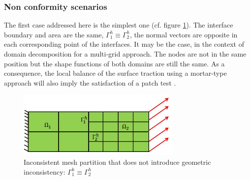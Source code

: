 \subsubsection{Non conformity scenarios}\label{sssec321}
 The first case addressed here is the simplest one (cf. figure \ref{fig.4}). The interface boundary and area are the same, $\Gamma_1^{h} \equiv \Gamma_2^{h} $, the normal vectors are opposite in each corresponding point of the interfaces. It may be the case, in the context of domain decomposition for a multi-grid approach. The nodes are not in the same position but the shape functions of both domains are still the same. As a consequence, the local balance of the surface traction using a mortar-type approach will also imply the satisfaction of a patch test \cite{park2002simpl}.
 \\
 \begin{figure}[ht]
 \centering
 \includegraphics[width=8cm]{images/Ch1/Mesh_inconsist_1}
 \caption{Inconsistent mesh partition that does not introduce geometric inconsistency: $\Gamma_1^{h} \equiv \Gamma_2^{h} $}  
 \label{fig.4}
 \end{figure}
 
